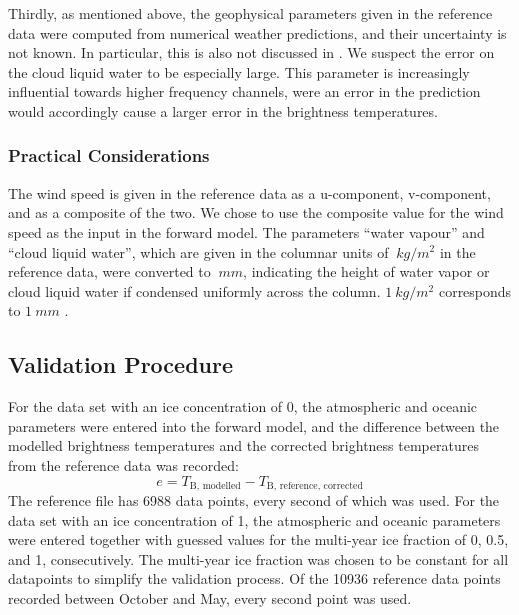 \documentclass[11pt, a4paper]{article}
\begin{document}
Thirdly, as mentioned above, the geophysical parameters given in the reference data were computed from numerical weather predictions, and their uncertainty is not known. In particular, this is also not discussed in \cite{Wink2}. We suspect the error on the cloud liquid water to be especially large. This parameter is increasingly influential towards higher frequency channels, were an error in the prediction would accordingly cause a larger error in the brightness temperatures.

\subsubsection{Practical Considerations}
The wind speed is given in the reference data as a u-component, v-component, and as a composite of the two. %
We chose to use the composite value for the wind speed as the input in the forward model. %
The parameters ``water vapour'' and ``cloud liquid water'', which are given in the columnar units of $\SI{}{kg/m^2}$ in the reference data, were converted to $\SI{}{mm}$, indicating the height of water vapor or cloud liquid water if condensed uniformly across the column. $\SI{1}{kg/m^2}$ corresponds to $\SI{1}{mm}$ \cite{remss}.


\subsection{Validation Procedure}

For the data set with an ice concentration of 0, the atmospheric and oceanic parameters were entered into the forward model, and the difference between the modelled brightness temperatures and the corrected brightness temperatures from the reference data was recorded:
\[
e=T_\text{B, modelled} - T_\text{B, reference, corrected}
\]
The reference file has 6988 data points, every second of which was used. For the data set with an ice concentration of 1, the atmospheric and oceanic parameters were entered together with guessed values for the multi-year ice fraction of 0, 0.5, and 1, consecutively. The multi-year ice fraction was chosen to be constant for all datapoints to simplify the validation process. Of the 10936 reference data points recorded between October and May, every second point was used.
\end{document}

